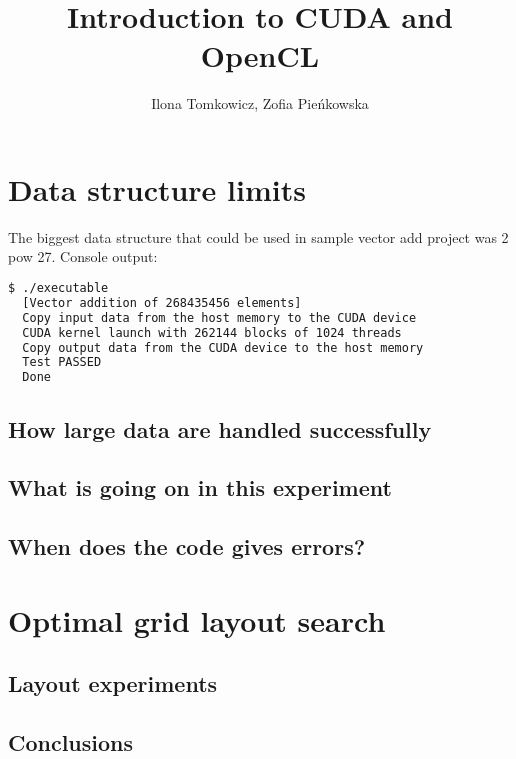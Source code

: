 \documentclass[12pt]{article}
\begin{document}
\title{Introduction to CUDA and OpenCL}
\author{Ilona Tomkowicz, Zofia Pieńkowska}

\maketitle
\tableofcontents
\newpage

\section{Data structure limits} 
The biggest data structure that could be used in sample vector add project was 2 pow 27.
\noindent Console output:
\begin{lstlisting}[language=bash]
  $ ./executable
  [Vector addition of 268435456 elements]
  Copy input data from the host memory to the CUDA device
  CUDA kernel launch with 262144 blocks of 1024 threads
  Copy output data from the CUDA device to the host memory
  Test PASSED
  Done
\end{lstlisting}



\subsection{How large data are handled successfully} 
\subsection{What is going on in this experiment}
\subsection{When does the code gives errors?}
\section{Optimal grid layout search} 
\subsection{Layout experiments}
\subsection{Conclusions}
\end{document}
